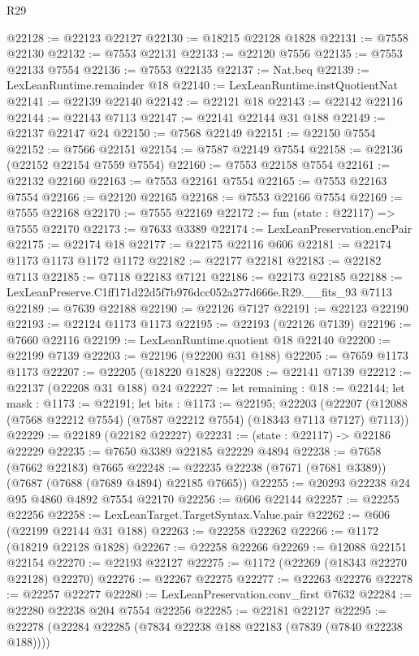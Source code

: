 \begin{lexlean}{R29}
\begin{coremodule}
@22128 := @22123 @22127
@22130 := @18215 @22128 @1828
@22131 := @7558 @22130
@22132 := @7553 @22131
@22133 := @22120 @7556
@22135 := @7553 @22133 @7554
@22136 := @7553 @22135
@22137 := Nat.beq
@22139 := LexLeanRuntime.remainder @18
@22140 := LexLeanRuntime.instQuotientNat
@22141 := @22139 @22140
@22142 := @22121 @18
@22143 := @22142 @22116
@22144 := @22143 @7113
@22147 := @22141 @22144 @31 @188
@22149 := @22137 @22147 @24
@22150 := @7568 @22149
@22151 := @22150 @7554
@22152 := @7566 @22151
@22154 := @7587 @22149 @7554
@22158 := @22136 (@22152 @22154 @7559 @7554)
@22160 := @7553 @22158 @7554
@22161 := @22132 @22160
@22163 := @7553 @22161 @7554
@22165 := @7553 @22163 @7554
@22166 := @22120 @22165
@22168 := @7553 @22166 @7554
@22169 := @7555 @22168
@22170 := @7555 @22169
@22172 := fun (state : @22117) => @7555 @22170
@22173 := @7633 @3389
@22174 := LexLeanPreservation.encPair
@22175 := @22174 @18
@22177 := @22175 @22116 @606
@22181 := @22174 @1173 @1173 @1172 @1172
@22182 := @22177 @22181
@22183 := @22182 @7113
@22185 := @7118 @22183 @7121
@22186 := @22173 @22185
@22188 := LexLeanPreserve.C1ff171d22d5f7b976dcc052a277d666e.R29.__fits_93 @7113
@22189 := @7639 @22188
@22190 := @22126 @7127
@22191 := @22123 @22190
@22193 := @22124 @1173 @1173
@22195 := @22193 (@22126 @7139)
@22196 := @7660 @22116
@22199 := LexLeanRuntime.quotient @18 @22140
@22200 := @22199 @7139
@22203 := @22196 (@22200 @31 @188)
@22205 := @7659 @1173 @1173
@22207 := @22205 (@18220 @1828)
@22208 := @22141 @7139
@22212 := @22137 (@22208 @31 @188) @24
@22227 := let remaining : @18 := @22144;
  let mask : @1173 := @22191;
  let bits : @1173 := @22195;
  @22203 (@22207 (@12088 (@7568 @22212 @7554) (@7587 @22212 @7554) (@18343 @7113 @7127) @7113))
@22229 := @22189 (@22182 @22227)
@22231 := (state : @22117) -> @22186 @22229
@22235 := @7650 @3389 @22185 @22229 @4894
@22238 := @7658 (@7662 @22183) @7665
@22248 := @22235 @22238 (@7671 (@7681 @3389)) (@7687 (@7688 (@7689 @4894) @22185 @7665))
@22255 := @20293 @22238 @24 @95 @4860 @4892 @7554 @22170
@22256 := @606 @22144
@22257 := @22255 @22256
@22258 := LexLeanTarget.TargetSyntax.Value.pair
@22262 := @606 (@22199 @22144 @31 @188)
@22263 := @22258 @22262
@22266 := @1172 (@18219 @22128 @1828)
@22267 := @22258 @22266
@22269 := @12088 @22151 @22154
@22270 := @22193 @22127
@22275 := @1172 (@22269 (@18343 @22270 @22128) @22270)
@22276 := @22267 @22275
@22277 := @22263 @22276
@22278 := @22257 @22277
@22280 := LexLeanPreservation.conv_first @7632
@22284 := @22280 @22238 @204 @7554 @22256
@22285 := @22181 @22127
@22295 := @22278 (@22284 @22285 (@7834 @22238 @188 @22183 (@7839 (@7840 @22238 @188))))

\end{coremodule}
\end{lexlean}

